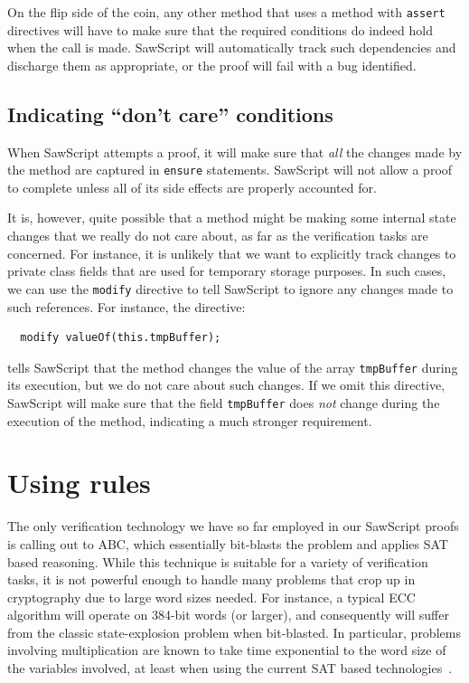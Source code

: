 \documentclass[12pt]{galois-whitepaper}
\newcommand{\sawScript}{{\sc SawScript}\xspace}
\begin{document}
On the flip side of the coin,
any other method that uses a method with {\tt assert} directives will have to make sure that the required conditions do indeed hold when the call is made.
\sawScript will automatically track such dependencies and discharge them as appropriate, or the proof will fail with a bug identified.

\subsection{Indicating ``don't care'' conditions}

When \sawScript attempts a proof, it will make sure that {\em all} the changes made by the method are captured in {\tt ensure} statements. \sawScript
will not allow a proof to complete unless all of its side effects are properly accounted for.

It is, however, quite possible that a method
might be making some internal state changes that we really do not care about, as far as the verification tasks are concerned. For instance,
it is unlikely that we want to explicitly track changes to private class fields that are used for temporary storage purposes.
In such cases, we can use the {\tt modify} directive to tell \sawScript to ignore any changes made to such references. For instance, the directive:
\begin{Verbatim}
  modify valueOf(this.tmpBuffer);
\end{Verbatim}
tells \sawScript that the method changes the value of the array {\tt tmpBuffer} during
its execution, but we do not care about such changes. If we omit this directive,
\sawScript will make sure that the field {\tt tmpBuffer} does {\em not} change during the execution of the method,
indicating a much stronger requirement.

\section{Using rules}\label{sec:rules}

The only verification technology we have so far employed in our \sawScript proofs is calling out to ABC, which essentially bit-blasts the problem
and applies SAT based reasoning. While this technique is suitable for a variety of verification tasks, it is not powerful enough to handle many
problems that crop up in cryptography due to large word sizes needed. For instance, a typical ECC algorithm will operate on 384-bit
words (or larger), and consequently will suffer from the classic state-explosion problem when bit-blasted. In particular, problems involving
multiplication are known to take time exponential to the word size of the variables involved, at least when using the current
SAT based technologies~\cite[Section 6.3.1]{DecisionProcedures2008}.
\end{document}
